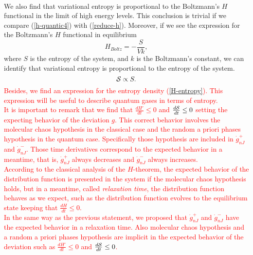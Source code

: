 \\
We also find that variational entropy is proportional to the Boltzmann's $H$ functional in the limit of high energy levels. This conclusion is trivial if we compare (\ref{h-quantic4}) with (\ref{reduce-h}). Moreover, if we see the expression for the Boltzmann's $H$ functional in equilibrium
\begin{equation}
    H_{Boltz}=-\frac{S}{Vk},
\end{equation}
where $S$ is the entropy of the system, and $k$ is the Boltzmann's constant, we can identify that variational entropy is proportional to the entropy of the system.\\
\begin{equation}
    \mathcal{S}\propto S.
\end{equation}
\textcolor{red}{Besides, we find an expression for the entropy density (\ref{H-entropy}). This expression will be useful to describe quantum gases in terms of entropy.\\
It is important to remark that we find that $\frac{dH'}{dt}\leq 0$ and $\frac{d\mathcal{S}}{dt}\leq 0$ setting the expecting behavior of the deviation $g$. This correct behavior involves the molecular chaos hypothesis in the classical case and the random a priori phases hypothesis in the quantum case. Specifically those hypothesis are included in $\dot{g}_{nJ}^{+}$ and $\dot{g}_{nJ}^{-}$. Those time derivatives correspond to the expected behavior in a meantime, that is, $\dot{g}_{nJ}^{+}$ always decreases and $\dot{g}_{nJ}^{-}$ always increases.\\ 
According to the classical analysis of the $H$-theorem, the expected behavior of the distribution function is presented in the system if the molecular chaos hypothesis holds, but in a meantime, called \textit{relaxation time}, the distribution function behaves as we expect, such as the distribution function evolves to the equilibrium state keeping that $\frac{dH}{dt}\leq 0$.\\
In the same way as the previous statement, we proposed that $\dot{g}_{nJ}^{+}$ and $\dot{g}_{nJ}^{-}$ have the expected behavior in a relaxation time. Also molecular chaos hypothesis and a random a priori phases hypothesis are implicit in the expected behavior of the deviation such as $\frac{dH'}{dt}\leq 0$ and $\frac{d\mathcal{S}}{dt}\leq 0$.}


